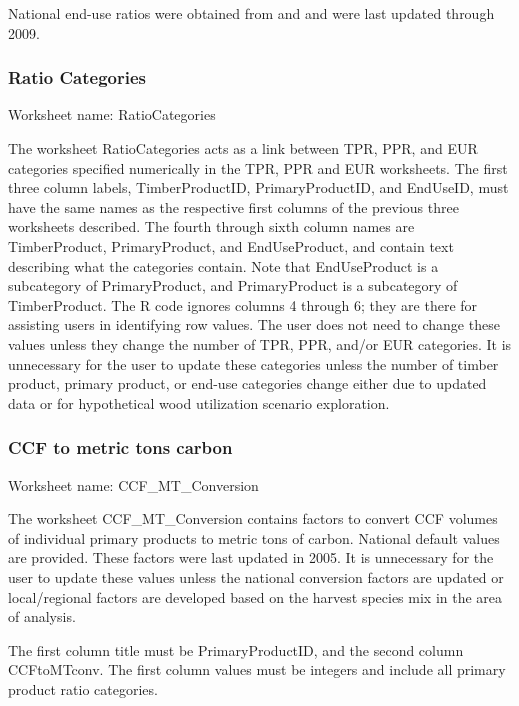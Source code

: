 \documentclass[
  openany]{book}
\begin{document}
National end-use ratios were obtained from \textcite{mckeever2009} and \textcite{mckeever2011} and were last updated through 2009.

\hypertarget{own-prov-input-rc}{%
\subsubsection{Ratio Categories}\label{own-prov-input-rc}}

Worksheet name: RatioCategories

The worksheet RatioCategories acts as a link between TPR, PPR, and EUR categories specified numerically in the TPR, PPR and EUR worksheets. The first three column labels, TimberProductID, PrimaryProductID, and EndUseID, must have the same names as the respective first columns of the previous three worksheets described. The fourth through sixth column names are TimberProduct, PrimaryProduct, and EndUseProduct, and contain text describing what the categories contain. Note that EndUseProduct is a subcategory of PrimaryProduct, and PrimaryProduct is a subcategory of TimberProduct. The R code ignores columns 4 through 6; they are there for assisting users in identifying row values. The user does not need to change these values unless they change the number of TPR, PPR, and/or EUR categories. It is unnecessary for the user to update these categories unless the number of timber product, primary product, or end-use categories change either due to updated data or for hypothetical wood utilization scenario exploration.

\hypertarget{own-prov-input-ccfMTC}{%
\subsubsection{CCF to metric tons carbon}\label{own-prov-input-ccfMTC}}

Worksheet name: CCF\_MT\_Conversion

The worksheet CCF\_MT\_Conversion contains factors to convert CCF volumes of individual primary products to metric tons of carbon. National default values are provided. These factors were last updated in 2005. It is unnecessary for the user to update these values unless the national conversion factors are updated or local/regional factors are developed based on the harvest species mix in the area of analysis.

The first column title must be PrimaryProductID, and the second column CCFtoMTconv. The first column values must be integers and include all primary product ratio categories.
\end{document}
